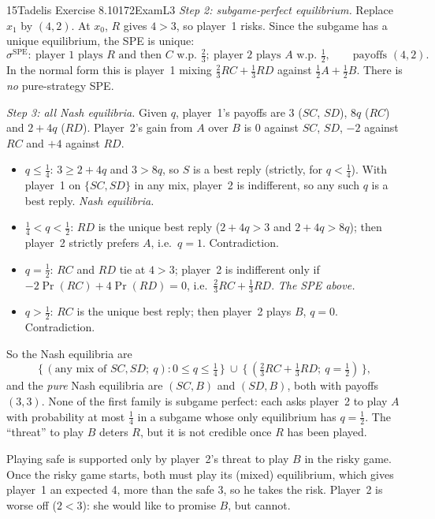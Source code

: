 \begin{exsol}{15}{Tadelis Exercise 8.10}{172}{Exam}{L3}
\emph{Step 2: subgame-perfect equilibrium.} Replace $x_1$ by $(4,2)$. At $x_0$, $R$ gives $4 > 3$,
so player~1 risks. Since the subgame has a unique equilibrium, the SPE is unique:
\[
  \sigma^{\text{SPE}}:\ \text{player 1 plays } R \text{ and then } C \text{ w.p. } \tfrac23;\
  \text{player 2 plays } A \text{ w.p. } \tfrac12,\qquad \text{payoffs } (4, 2).
\]
In the normal form this is player~1 mixing $\frac23 RC + \frac13 RD$ against $\frac12 A + \frac12 B$.
There is \emph{no} pure-strategy SPE.

\emph{Step 3: all Nash equilibria.} Given $q$, player~1's payoffs are $3$ ($SC$, $SD$), $8q$ ($RC$)
and $2 + 4q$ ($RD$). Player~2's gain from $A$ over $B$ is $0$ against $SC$, $SD$, $-2$ against $RC$
and $+4$ against $RD$.
\begin{itemize}
  \item $q \le \frac14$: $3 \ge 2 + 4q$ and $3 > 8q$, so $S$ is a best reply (strictly, for $q<\frac14$).
  With player~1 on $\{SC,SD\}$ in any mix, player~2 is indifferent, so any such $q$ is a best reply.
  \emph{Nash equilibria.}
  \item $\frac14 < q < \frac12$: $RD$ is the unique best reply ($2+4q > 3$ and $2 + 4q > 8q$);
  then player~2 strictly prefers $A$, i.e.\ $q = 1$. Contradiction.
  \item $q = \frac12$: $RC$ and $RD$ tie at $4 > 3$; player~2 is indifferent only if
  $-2\Pr(RC) + 4\Pr(RD) = 0$, i.e.\ $\frac23 RC + \frac13 RD$. \emph{The SPE above.}
  \item $q > \frac12$: $RC$ is the unique best reply; then player~2 plays $B$, $q = 0$. Contradiction.
\end{itemize}
So the Nash equilibria are
\[
  \bigl\{\,(\text{any mix of } SC, SD;\ q) : 0 \le q \le \tfrac14 \,\bigr\}
  \ \cup\ \bigl\{\,(\tfrac23 RC + \tfrac13 RD;\ q = \tfrac12)\,\bigr\},
\]
and the \emph{pure} Nash equilibria are $(SC, B)$ and $(SD, B)$, both with payoffs $(3,3)$.
None of the first family is subgame perfect: each asks player~2 to play $A$ with probability at
most $\frac14$ in a subgame whose only equilibrium has $q = \frac12$. The ``threat'' to play $B$
deters $R$, but it is not credible once $R$ has been played.

\interp Playing safe is supported only by player~2's threat to play $B$ in the risky game. Once
the risky game starts, both must play its (mixed) equilibrium, which gives player~1 an expected
4, more than the safe 3, so he takes the risk. Player~2 is worse off ($2 < 3$): she would like to
promise $B$, but cannot.


\end{exsol}
